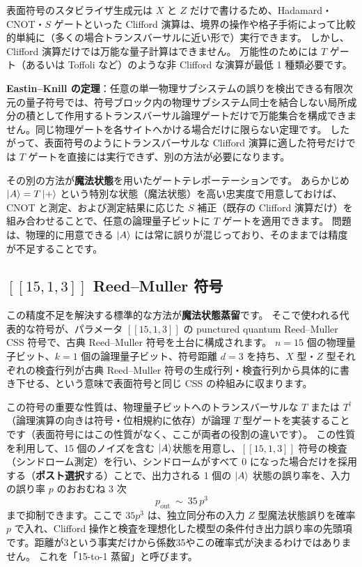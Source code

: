 表面符号のスタビライザ生成元は $X$ と $Z$ だけで書けるため、Hadamard・CNOT・$S$ ゲートといった Clifford 演算は、境界の操作や格子手術によって比較的単純に（多くの場合トランスバーサルに近い形で）実行できます。
しかし、Clifford 演算だけでは万能な量子計算はできません。
万能性のためには $T$ ゲート（あるいは Toffoli など）のような非 Clifford な演算が最低 1 種類必要です。

\begin{notebox}
  \textbf{Eastin--Knill の定理}：任意の単一物理サブシステムの誤りを検出できる有限次元の量子符号では、符号ブロック内の物理サブシステム同士を結合しない局所成分の積として作用するトランスバーサル論理ゲートだけで万能集合を構成できません。同じ物理ゲートを各サイトへかける場合だけに限らない定理です\cite{eastin2009transversal}。
  したがって、表面符号のようにトランスバーサルな Clifford 演算に適した符号だけでは $T$ ゲートを直接には実行できず、別の方法が必要になります。
\end{notebox}

その別の方法が\textbf{魔法状態}を用いたゲートテレポーテーションです。
あらかじめ $\ket{A} = T\ket{+}$ という特別な状態（魔法状態）を高い忠実度で用意しておけば、CNOT と測定、および測定結果に応じた $S$ 補正（既存の Clifford 演算だけ）を組み合わせることで、任意の論理量子ビットに $T$ ゲートを適用できます。
問題は、物理的に用意できる $\ket{A}$ には常に誤りが混じっており、そのままでは精度が不足することです。

\subsection{$[[15,1,3]]$ Reed–Muller 符号}

この精度不足を解決する標準的な方法が\textbf{魔法状態蒸留}です。
そこで使われる代表的な符号が、パラメータ $[[15,1,3]]$ の punctured quantum Reed--Muller CSS 符号で、古典 Reed--Muller 符号を土台に構成されます\cite{bravyi2005magic}。
$n=15$ 個の物理量子ビット、$k=1$ 個の論理量子ビット、符号距離 $d=3$ を持ち、$X$ 型・$Z$ 型それぞれの検査行列が古典 Reed–Muller 符号の生成行列・検査行列から具体的に書き下せる、という意味で表面符号と同じ CSS の枠組みに収まります。

この符号の重要な性質は、物理量子ビットへのトランスバーサルな $T$ または $T^\dagger$（論理演算の向きは符号・位相規約に依存）が論理 $T$ 型ゲートを実装することです（表面符号にはこの性質がなく、ここが両者の役割の違いです）。
この性質を利用して、15 個のノイズを含む $\ket{A}$状態を用意し、$[[15,1,3]]$ 符号の検査（シンドローム測定）を行い、シンドロームがすべて $0$ になった場合だけを採用する（\textbf{ポスト選択}する）ことで、出力される 1 個の $\ket{A}$ 状態の誤り率を、入力の誤り率 $p$ のおおむね 3 次
\begin{equation}
  p_{\mathrm{out}} \ \sim\ 35\, p^3
\end{equation}
まで抑制できます。ここで $35p^3$ は、独立同分布の入力 $Z$ 型魔法状態誤りを確率 $p$ で入れ、Clifford 操作と検査を理想化した模型の条件付き出力誤り率の先頭項です。距離が3という事実だけから係数35やこの確率式が決まるわけではありません\cite{bravyi2005magic}。
これを「15-to-1 蒸留」と呼びます。

